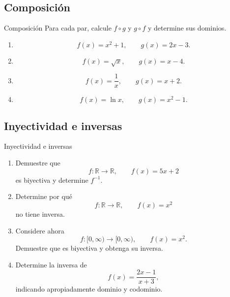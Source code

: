 \documentclass[aspectratio=169,10pt]{beamer}
\newcommand{\R}{\mathbb{R}}
\begin{document}
\subsection{Composición}
\begin{frame}{Composición}
Para cada par, calcule $f\circ g$ y $g\circ f$ y determine sus dominios.

\begin{enumerate}
    \item
    \[
    f(x)=x^2+1,\qquad g(x)=2x-3.
    \]
    \item
    \[
    f(x)=\sqrt{x},\qquad g(x)=x-4.
    \]
    \item
    \[
    f(x)=\frac1x,\qquad g(x)=x+2.
    \]
    \item
    \[
    f(x)=\ln x,\qquad g(x)=x^2-1.
    \]
\end{enumerate}
\end{frame}
\subsection{Inyectividad e inversas}
\begin{frame}{Inyectividad e inversas}
\begin{enumerate}
    \item Demuestre que
    \[
    f:\R\to\R,\qquad f(x)=5x+2
    \]
    es biyectiva y determine $f^{-1}$.

    \item Determine por qué
    \[
    f:\R\to\R,\qquad f(x)=x^2
    \]
    no tiene inversa.

    \item Considere ahora
    \[
    f:[0,\infty)\to[0,\infty),\qquad f(x)=x^2.
    \]
    Demuestre que es biyectiva y obtenga su inversa.

    \item Determine la inversa de
    \[
    f(x)=\frac{2x-1}{x+3},
    \]
    indicando apropiadamente dominio y codominio.
\end{enumerate}
\end{frame}
\end{document}
